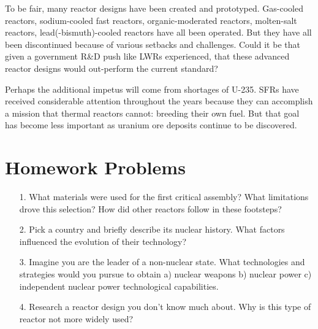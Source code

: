 To be fair, many reactor designs have been created and prototyped. Gas-cooled reactors, sodium-cooled fast reactors, organic-moderated reactors, molten-salt reactors, lead(-bismuth)-cooled reactors have all been operated. But they have all been discontinued because of various setbacks and challenges. Could it be that given a government R\&D push like LWRs experienced, that these advanced reactor designs would out-perform the current standard?

Perhaps the additional impetus will come from shortages of U-235. SFRs have received considerable attention throughout the years because they can accomplish a mission that thermal reactors cannot: breeding their own fuel.
But that goal has become less important as uranium ore deposits continue to be discovered.

\section{Homework Problems}
\begin{itemize}
  \item[1.] What materials were used for the first critical assembly? What limitations drove this selection? How did other reactors follow in these footsteps?
  \item[2.] Pick a country and briefly describe its nuclear history. What factors influenced the evolution of their technology?
  \item[3.] Imagine you are the leader of a non-nuclear state. What technologies and strategies would you pursue to obtain a) nuclear weapons b) nuclear power c) independent nuclear power technological capabilities.
  \item[4.] Research a reactor design you don't know much about. Why is this type of reactor not more widely used?
\end{itemize}






